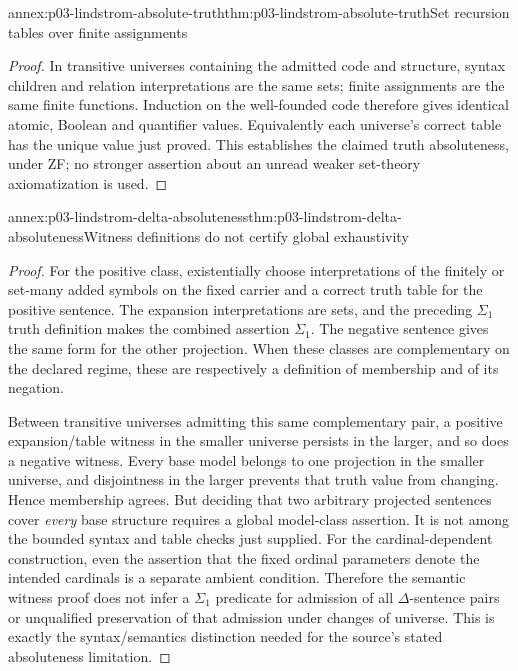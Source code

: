 \begin{annexitem}{annex:p03-lindstrom-absolute-truth}{thm:p03-lindstrom-absolute-truth}{Set recursion tables over finite assignments}
\begin{proof}
In transitive universes containing the admitted code and structure, syntax
children and relation interpretations are the same sets; finite assignments
are the same finite functions. Induction on the well-founded code therefore
gives identical atomic, Boolean and quantifier values. Equivalently each
universe's correct table has the unique value just proved. This establishes
the claimed truth absoluteness, under ZF; no stronger assertion about an
unread weaker set-theory axiomatization is used.
\end{proof}
\end{annexitem}

\begin{annexitem}{annex:p03-lindstrom-delta-absoluteness}{thm:p03-lindstrom-delta-absoluteness}{Witness definitions do not certify global exhaustivity}
\begin{proof}
For the positive class, existentially choose interpretations of the finitely
or set-many added symbols on the fixed carrier and a correct truth table
for the positive sentence. The expansion interpretations are sets, and the
preceding \(\Sigma_1\) truth definition makes the combined assertion
\(\Sigma_1\). The negative sentence gives the same form for the other
projection. When these classes are complementary on the declared regime,
these are respectively a definition of membership and of its negation.

Between transitive universes admitting this same complementary pair, a
positive expansion/table witness in the smaller universe persists in the
larger, and so does a negative witness. Every base model belongs to one
projection in the smaller universe, and disjointness in the larger prevents
that truth value from changing. Hence membership agrees. But deciding
that two arbitrary projected sentences cover \emph{every} base structure
requires a global model-class assertion. It is not among the bounded syntax
and table checks just supplied. For the cardinal-dependent construction,
even the assertion that the fixed ordinal parameters denote the intended
cardinals is a separate ambient condition. Therefore the semantic witness
proof does not infer a \(\Sigma_1\) predicate for admission of all
\(\Delta\)-sentence pairs or unqualified preservation of that admission
under changes of universe. This is exactly the syntax/semantics distinction
needed for the source's stated absoluteness limitation.
\end{proof}
\end{annexitem}

